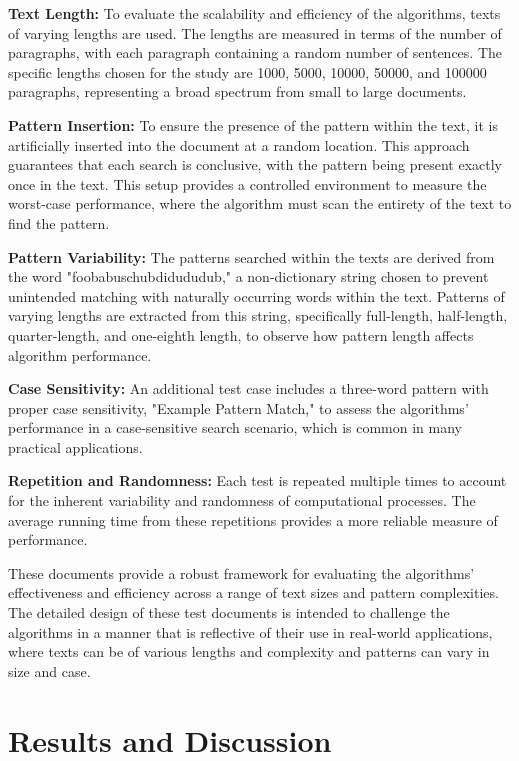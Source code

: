 \documentclass{article}
\begin{document}
\textbf{Text Length:}
To evaluate the scalability and efficiency of the algorithms, texts of varying lengths are used. The lengths are measured in terms of the number of paragraphs, with each paragraph containing a random number of sentences. The specific lengths chosen for the study are 1000, 5000, 10000, 50000, and 100000 paragraphs, representing a broad spectrum from small to large documents.

\textbf{Pattern Insertion:}
To ensure the presence of the pattern within the text, it is artificially inserted into the document at a random location. This approach guarantees that each search is conclusive, with the pattern being present exactly once in the text. This setup provides a controlled environment to measure the worst-case performance, where the algorithm must scan the entirety of the text to find the pattern.

\textbf{Pattern Variability:}
The patterns searched within the texts are derived from the word "foobabuschubdidududub," a non-dictionary string chosen to prevent unintended matching with naturally occurring words within the text. Patterns of varying lengths are extracted from this string, specifically full-length, half-length, quarter-length, and one-eighth length, to observe how pattern length affects algorithm performance.

\textbf{Case Sensitivity:}
An additional test case includes a three-word pattern with proper case sensitivity, "Example Pattern Match," to assess the algorithms' performance in a case-sensitive search scenario, which is common in many practical applications.

\textbf{Repetition and Randomness:}
Each test is repeated multiple times to account for the inherent variability and randomness of computational processes. The average running time from these repetitions provides a more reliable measure of performance.

These documents provide a robust framework for evaluating the algorithms' effectiveness and efficiency across a range of text sizes and pattern complexities. The detailed design of these test documents is intended to challenge the algorithms in a manner that is reflective of their use in real-world applications, where texts can be of various lengths and complexity and patterns can vary in size and case.

\section{Results and Discussion}
\end{document}
